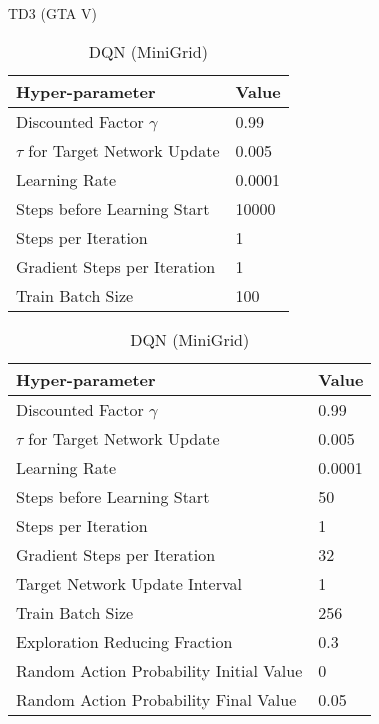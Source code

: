 \begin{table}[H]
\begin{small}
\begin{minipage}{0.45\linewidth}
\centering
\caption{TD3 (GTA V)}
\begin{tabular}{@{}ll@{}}
\toprule
Hyper-parameter             & Value  \\ \midrule
Discounted Factor $\gamma$   & 0.99  \\
$\tau$ for Target Network Update & 0.005 \\
Learning Rate              & 0.0001 \\ 
Steps before Learning Start & 10000\\
Steps per Iteration & 1\\
Gradient Steps per Iteration & 1\\
Train Batch Size & 100  \\
\bottomrule
\end{tabular}
\end{minipage}\hfill
\begin{minipage}{0.45\linewidth}
\centering
\caption{DQN (MiniGrid)}
\begin{tabular}{@{}ll@{}}
\toprule
Hyper-parameter             & Value  \\ \midrule
Discounted Factor $\gamma$   & 0.99  \\
$\tau$ for Target Network Update & 0.005 \\
Learning Rate              & 0.0001 \\ 
Steps before Learning Start & 50\\
Steps per Iteration & 1\\
Gradient Steps per Iteration & 32\\
Target Network Update Interval & 1\\
Train Batch Size & 256  \\
Exploration Reducing Fraction & 0.3 \\
Random Action Probability Initial Value & 0 \\
Random Action Probability Final Value & 0.05 \\
\bottomrule
\end{tabular}
\end{minipage}
\end{small}
\end{table}

